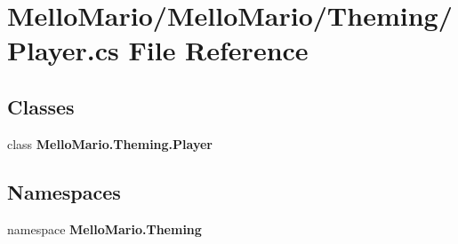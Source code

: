 \section{Mello\+Mario/\+Mello\+Mario/\+Theming/\+Player.cs File Reference}
\label{Player_8cs}
\subsection*{Classes}
\begin{DoxyCompactItemize}
\item 
class \textbf{ Mello\+Mario.\+Theming.\+Player}
\end{DoxyCompactItemize}
\subsection*{Namespaces}
\begin{DoxyCompactItemize}
\item 
namespace \textbf{ Mello\+Mario.\+Theming}
\end{DoxyCompactItemize}
